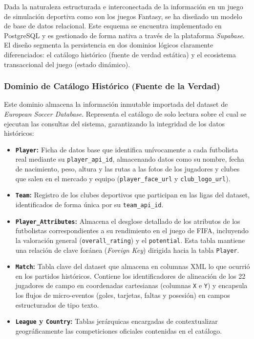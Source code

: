 Dada la naturaleza estructurada e interconectada de la información en un juego de simulación deportiva como son los juegos Fantasy, se ha diseñado un modelo de base de datos relacional. Este esquema se encuentra implementado en PostgreSQL y es gestionado de forma nativa a través de la plataforma \textit{Supabase}. El diseño segmenta la persistencia en dos dominios lógicos claramente diferenciados: el catálogo histórico (fuente de verdad estática) y el ecosistema transaccional del juego (estado dinámico).

\subsubsection{Dominio de Catálogo Histórico (Fuente de la Verdad)}
Este dominio almacena la información inmutable importada del dataset de \textit{European Soccer Database}. Representa el catálogo de solo lectura sobre el cual se ejecutan las consultas del sistema, garantizando la integridad de los datos históricos:

\begin{itemize}
    \item \textbf{\texttt{Player}:} Ficha de datos base que identifica unívocamente a cada futbolista real mediante su \texttt{player\_api\_id}, almacenando datos como su nombre, fecha de nacimiento, peso, altura y las rutas a las fotos de los jugadores y clubes que salen en el mercado y equipo (\texttt{player\_face\_url} y \texttt{club\_logo\_url}).
    \item \textbf{\texttt{Team}:} Registro de los clubes deportivos que participan en las ligas del dataset, identificados de forma única por su \texttt{team\_api\_id}.
    \item \textbf{\texttt{Player\_Attributes}:} Almacena el desglose detallado de los atributos de los futbolistas correspondientes a su rendimiento en el juego de FIFA, incluyendo la valoración general (\texttt{overall\_rating}) y el \texttt{potential}. Esta tabla mantiene una relación de clave foránea (\textit{Foreign Key}) dirigida hacia la tabla \texttt{Player}.
    \item \textbf{\texttt{Match}:} Tabla clave del dataset que almacena en columnas XML lo que ocurrió en los partidos históricos. Contiene los identificadores de alineación de los 22 jugadores de campo en coordenadas cartesianas (columnas \texttt{X} e \texttt{Y}) y encapsula los flujos de micro-eventos (goles, tarjetas, faltas y posesión) en campos estructurados de tipo texto.
    \item \textbf{\texttt{League} y \texttt{Country}:} Tablas jerárquicas encargadas de contextualizar geográficamente las competiciones oficiales contenidas en el catálogo.
\end{itemize}

